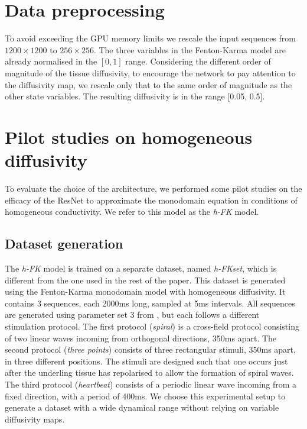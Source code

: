 \documentclass[utf8]{frontiers_suppmat} %
\begin{document}
\section{Data preprocessing}
\label{sec:supp:preprocessing}
To avoid exceeding the GPU memory limits we rescale the input sequences from $1200 \times 1200$ to $256 \times 256$.
The three variables in the Fenton-Karma model are already normalised in the $[0, 1]$ range. 
Considering the different order of magnitude of the tissue diffusivity, to encourage the network to pay attention to the diffusivity map, we rescale only that to the same order of magnitude as the other state variables. The resulting diffusivity is in the range [0.05, 0.5].


\section{Pilot studies on homogeneous diffusivity}
\label{sec:supp:homogeneous}
To evaluate the choice of the architecture, we performed some pilot studies on the efficacy of the ResNet to approximate the monodomain equation in conditions of homogeneous conductivity. We refer to this model as the \textit{h-FK} model.


\subsection{Dataset generation}
\label{sec:supp:homogeneous:data}
The \textit{h-FK} model is trained on a separate dataset, named \textit{h-FKset}, which is different from the one used in the rest of the paper. 
This dataset is generated using the Fenton-Karma monodomain model with homogeneous diffusivity. It contains 3 sequences, each 2000ms long, sampled at 5ms intervals. 
All sequences are generated using parameter set 3 from \cite{Fenton2002}, but each follows a different stimulation protocol. 
The first protocol (\textit{spiral}) is a cross-field protocol consisting of two linear waves incoming from orthogonal directions, 350ms apart.
The second protocol (\textit{three points}) consists of three rectangular stimuli, 350ms apart, in three different positions. The stimuli are designed such that one occurs just after the underling tissue has repolarised to allow the formation of spiral waves. 
The third protocol (\textit{heartbeat}) consists of a periodic linear wave incoming from a fixed direction, with a period of 400ms. 
We choose this experimental setup to generate a dataset with a wide dynamical range without relying on variable diffusivity maps.
\end{document}
